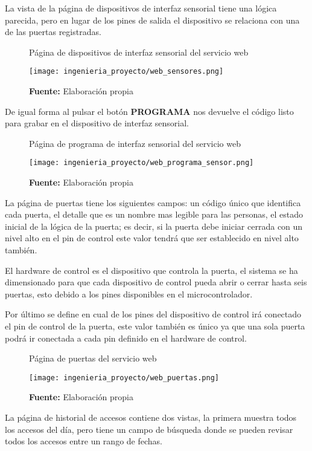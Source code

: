 \documentclass[../principal]{subfiles}
\begin{document}
  La vista de la página de dispositivos de interfaz sensorial tiene una lógica parecida, pero en lugar de los pines de salida el dispositivo se relaciona con una de las puertas registradas.

  \begin{figure}[H]
    \centering
    \caption{Página de dispositivos de interfaz sensorial del servicio web}
    \texttt{[image: ingenieria\_proyecto/web\_sensores.png]}
    \caption*{\textbf{Fuente:} Elaboración propia}
    \label{fig:web_sensores}
  \end{figure}

  De igual forma al pulsar el botón \textbf{PROGRAMA} nos devuelve el código listo para grabar en el dispositivo de interfaz sensorial.

  \begin{figure}[H]
    \centering
    \caption{Página de programa de interfaz sensorial del servicio web}
    \texttt{[image: ingenieria\_proyecto/web\_programa\_sensor.png]}
    \caption*{\textbf{Fuente:} Elaboración propia}
    \label{fig:web_programa_sensor}
  \end{figure}

  La página de puertas tiene los siguientes campos: un código único que identifica cada puerta, el detalle que es un nombre mas legible para las personas, el estado inicial de la lógica de la puerta; es decir, si la puerta debe iniciar cerrada con un nivel alto en el pin de control este valor tendrá que ser establecido en nivel alto también.

  El hardware de control es el dispositivo que controla la puerta, el sistema se ha dimensionado para que cada dispositivo de control pueda abrir o cerrar hasta seis puertas, esto debido a los pines disponibles en el microcontrolador.

  Por último se define en cual de los pines del dispositivo de control irá conectado el pin de control de la puerta, este valor también es único ya que una sola puerta podrá ir conectada a cada pin definido en el hardware de control.

  \begin{figure}[H]
    \centering
    \caption{Página de puertas del servicio web}
    \texttt{[image: ingenieria\_proyecto/web\_puertas.png]}
    \caption*{\textbf{Fuente:} Elaboración propia}
    \label{fig:web_puertas}
  \end{figure}

  La página de historial de accesos contiene dos vistas, la primera muestra todos los accesos del día, pero tiene un campo de búsqueda donde se pueden revisar todos los accesos entre un rango de fechas.
\end{document}
